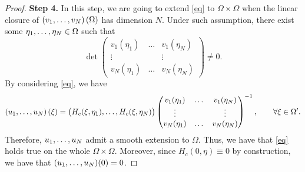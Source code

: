 \documentclass{article}
\begin{document}
\begin{proof}
\medskip\noindent
\textbf{\large Step 4.} 
In this step, we are going to extend \eqref{eq} to $\Omega\times\Omega$ when the linear closure of $(v_1,\mathellipsis,v_N)\left(\Omega\right)$ has dimension $N$. 
Under such assumption, there exist some $\eta_1,\mathellipsis,\eta_N\in\Omega$ such that
\begin{equation*}\det
 \begin{pmatrix}
v_1(\eta_1)&\dots&v_1(\eta_N)\\
\vdots & &\vdots\\
 v_N(\eta_1)&\dots& v_N(\eta_N)
\end{pmatrix}\neq 0.
\end{equation*}
By considering \eqref{eq}, we have
$$ 
(u_1,\mathellipsis,u_N)\,(\xi)=\big(H_c(\xi,\eta_1),\mathellipsis,H_c(\xi,\eta_N)\big)
 \begin{pmatrix}
v_1(\eta_1)&\dots&v_1(\eta_N)\\
\vdots & &\vdots\\
 v_N(\eta_1)&\dots& v_N(\eta_N)
\end{pmatrix}^{-1}, \qquad \forall\xi\in\Omega'.
$$
Therefore, $u_1,\mathellipsis,u_N$ admit a smooth extension to $\Omega$. Thus, we have that \eqref{eq} holds true on the whole $\Omega\times\Omega$. Moreover, since $H_c(0,\eta)\equiv 0$ by construction, we have that $(u_1,\mathellipsis,u_N)(0)=0$.









\end{proof}
\end{document}

